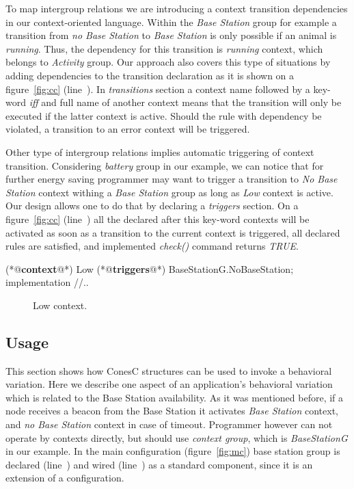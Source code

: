 To map intergroup relations we are introducing a context transition dependencies in our context-oriented language. Within the \emph{Base Station} group for example a transition from \emph{no Base Station} to \emph{Base Station} is only possible if an animal is \emph{running}. Thus, the dependency for this transition is \emph{running} context, which belongs to \emph{Activity} group. Our approach also covers this type of situations by adding dependencies to the transition declaration as it is shown on a figure~\ref{fig:cc} (line~). In \emph{transitions} section a context name followed by a key-word \emph{iff} and full name of another context means that the transition will only be executed if the latter context is active. Should the rule with dependency be violated, a transition to an error context will be triggered.

Other type of intergroup relations implies automatic triggering of context transition. Considering \emph{battery} group in our example, we can notice that for further energy saving programmer may want to trigger a transition to \emph{No Base Station} context withing a \emph{Base Station} group as long as \emph{Low} context is active. Our design allows one to do that by declaring a \emph{triggers} section. On a figure~\ref{fig:cc} (line~) all the declared after this key-word contexts will be activated as soon as a transition to the current context is triggered, all declared rules are satisfied, and implemented \emph{check()} command returns \emph{TRUE}.

\begin{Sbox}
\begin{minipage}{\columnwidth}
\begin{csource}
(*@\textbf{context}@*) Low {
 (*@\textbf{triggers}@*) BaseStationG.NoBaseStation;
}implementation {
 //..}
\end{csource}
\end{minipage}
\end{Sbox}
\begin{figure}[!h]
 \TheSbox
 \caption{Low context.}
 \label{fig:lc}
\end{figure}

\subsection{Usage}

This section shows how ConesC structures can be used to invoke a behavioral variation. Here we describe one aspect of an application's behavioral variation which is related to the Base Station availability. As it was mentioned before, if a node receives a beacon from the Base Station it activates \emph{Base Station} context, and \emph{no Base Station} context in case of timeout. Programmer however can not operate by contexts directly, but should use \emph{context group}, which is \emph{BaseStationG} in our example. In the main configuration (figure~\ref{fig:mc}) base station group is declared (line~) and wired (line~) as a standard component, since it is an extension of a configuration.

